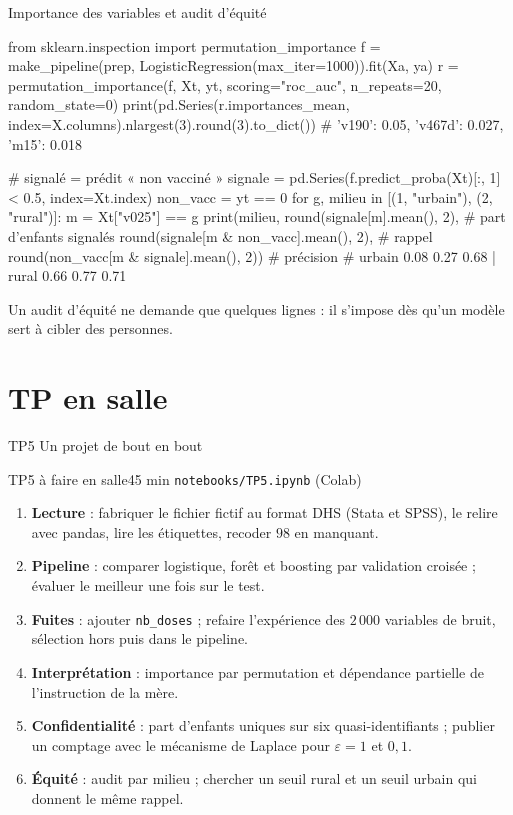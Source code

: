 \documentclass[aspectratio=169,11pt]{beamer}
\begin{document}
\begin{frame}[fragile]{Importance des variables et audit d'équité}
\begin{python}[basicstyle=\ttfamily\scriptsize]
from sklearn.inspection import permutation_importance
f = make_pipeline(prep, LogisticRegression(max_iter=1000)).fit(Xa, ya)
r = permutation_importance(f, Xt, yt, scoring="roc_auc", n_repeats=20, random_state=0)
print(pd.Series(r.importances_mean, index=X.columns).nlargest(3).round(3).to_dict())
# {'v190': 0.05, 'v467d': 0.027, 'm15': 0.018}

# signalé = prédit « non vacciné »
signale = pd.Series(f.predict_proba(Xt)[:, 1] < 0.5, index=Xt.index)
non_vacc = yt == 0
for g, milieu in [(1, "urbain"), (2, "rural")]:
    m = Xt["v025"] == g
    print(milieu, round(signale[m].mean(), 2),          # part d'enfants signalés
          round(signale[m & non_vacc].mean(), 2),        # rappel
          round(non_vacc[m & signale].mean(), 2))        # précision
# urbain 0.08 0.27 0.68 | rural 0.66 0.77 0.71
\end{python}
\vskip-1mm
{\small\color{cnfGris}Un audit d'équité ne demande que quelques lignes : il s'impose dès qu'un modèle sert à cibler des personnes.}
\end{frame}

\section{TP en salle}

\begin{frame}{TP5 \textendash{} Un projet de bout en bout}
  \footnotesize
  \begin{tp}{TP5 \textendash{} à faire en salle}{45 min \textperiodcentered{} \texttt{notebooks/TP5.ipynb} (Colab)}
    \begin{enumerate}\setlength\itemsep{0pt}
      \item \textbf{Lecture} : fabriquer le fichier fictif au format DHS (Stata et SPSS), le relire avec pandas, lire les étiquettes, recoder $98$ en manquant.
      \item \textbf{Pipeline} : comparer logistique, forêt et boosting par validation croisée ; évaluer le meilleur une fois sur le test.
      \item \textbf{Fuites} : ajouter \texttt{nb\_doses} ; refaire l'expérience des $2\,000$ variables de bruit, sélection hors puis dans le pipeline.
      \item \textbf{Interprétation} : importance par permutation et dépendance partielle de l'instruction de la mère.
      \item \textbf{Confidentialité} : part d'enfants uniques sur six quasi-identifiants ; publier un comptage avec le mécanisme de Laplace pour $\varepsilon=1$ et $0{,}1$.
      \item \textbf{Équité} : audit par milieu ; chercher un seuil rural et un seuil urbain qui donnent le même rappel.
    \end{enumerate}
  \end{tp}
\end{frame}
\end{document}
